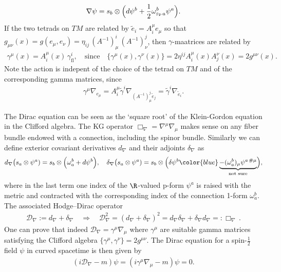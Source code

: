 \begin{mytheorem}
\begin{align}
    \nabla \psi = s_b \otimes \Big( d\psi^b + \frac{1}{2} \omega_{\text{\tiny Sp}\, a}^b \psi^a\Big).
\end{align}
If the two tetrads on $TM$ are related by $\tilde{e}_i = A_i^\mu e_\mu$  so that $g_{\mu\nu}(x) = g(e_\mu,e_\nu) = \eta_{ij} \,(A^{-1})_\mu^i\,(A^{-1})_\nu^j$, then $\gamma$-maatrices are related by
\begin{align}
    \gamma^\mu(x) = A_i^\mu(x)\, \gamma^i_{\mathrm{fl}}, \quad \text{since}\quad \{\gamma^\mu(x), \gamma^\nu(x)\} = 2 \eta^{ij} A_i^\mu(x) A_j^\nu(x) = 2 g^{\mu\nu}(x).
\end{align}
Note the action is indepent of the choice of the tetrad on $TM$ and of the corresponding gamma matrices, since
\begin{align}
    \gamma^\mu \nabla_{e_\mu} = A^\mu_i \tilde{\gamma}^i \nabla_{(A^{-1})_\mu^j \tilde{e}_j} = \tilde{\gamma}^i \nabla_{\tilde{e}_i}.
\end{align}
%
\end{mytheorem}




\begin{mytheorem}
%
The Dirac equation can be seen as the `square root' of the Klein-Gordon equation in the Clifford algebra.
The KG operator $\Box_\nabla = \nabla^\mu \nabla_\mu$ makes sense on any fiber bundle endowed with a connection, including the spinor bundle.
Similarly we can define exterior covariant derivatives $d_\nabla$ and their adjoints $\delta_\nabla$ as
\begin{align}
    d_\nabla \big(s_a\otimes \psi^a)= s_b \otimes \Big(\omega^b_a+d\psi^b\Big),\quad 
    \delta_\nabla \big(s_a\otimes \psi^a)= s_b \otimes \Big(\delta \psi^b {\color{blue}\underbrace{- (\omega^b_a)_\mu \psi^{a\,\#\mu}}_{\text{not sure}}}\Big),
\end{align}
{\color{blue} where in the last term one index of the $\R$-valued p-form $\psi^a$ is raised with the metric and contracted with the corresponding index of the connection 1-form $\omega^b_a$.}
The associated Hodge--Dirac operator
\begin{align}
    \mathcal{D}_\nabla := d_\nabla + \delta_\nabla \quad \Rightarrow \quad \mathcal{D}_\nabla^2= (d_\nabla + \delta_\nabla)^2 = d_\nabla \delta_\nabla + \delta_\nabla d_\nabla =: \Box_\nabla\,.
\end{align}
One can prove that indeed $\mathcal{D}_\nabla = \gamma^\mu \nabla_\mu$ where $\gamma^\mu$ are suitable gamma matrices satisfying the Clifford algebra $\{\gamma^\mu, \gamma^\nu\} = 2 g^{\mu\nu}$.
The Dirac equation for a spin-$\tfrac{1}{2}$ field $\psi$ in curved spacetime is then given by
\begin{align}
    (i \mathcal{D}_\nabla - m) \psi = (i \gamma^\mu \nabla_\mu - m) \psi = 0.
\end{align}
%
\end{mytheorem}



